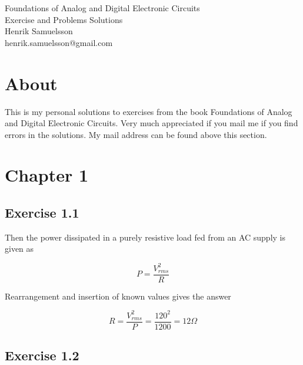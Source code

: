 \documentclass[]{article}
\begin{document}
\begingroup  
	\raggedright
	\Large Foundations of Analog and Digital Electronic Circuits\\
	\Large Exercise and Problems Solutions\\
	\vspace{3mm} %
	\normalsize Henrik Samuelsson\\
	\normalsize henrik.samuelsson@gmail.com
\endgroup
	
\section*{About}
	This is my personal solutions to exercises from the book Foundations of Analog and Digital Electronic Circuits. Very much appreciated if you mail me if you find errors in the solutions. My mail address can be found above this section.

\section*{Chapter 1}

\subsection*{Exercise 1.1}
	
	Then the power dissipated in a purely resistive load fed from an AC supply is given as
	
	\begin{equation*}
		P = \dfrac{ V^{2}_{rms} }{ R }
	\end{equation*}
		
	Rearrangement and insertion of known values gives the answer
	
	\begin{equation*}
		R = \dfrac{ V^{2}_{rms} }{ P } = \dfrac{ 120^{2} }{ 1200 } = 12 \Omega
	\end{equation*}	

\subsection*{Exercise 1.2}
\end{document}
